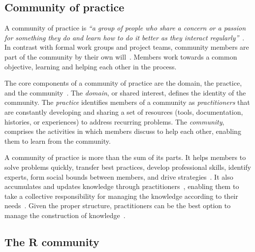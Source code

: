 \subsection{Community of practice}
    A community of practice is \textit{``a group of people who share a concern or a passion for something they do and learn how to do it better as they interact regularly''}~\cite{Wenger2000}.
    In contrast with formal work groups and project teams, community members are part of the community by their own will~\cite{Wenger2000}.
    Members work towards a common objective, learning and helping each other in the process.

    The core components of a community of practice are the domain, the practice, and the community~\cite{Wenger2011}.
    The \textit{domain}, or shared interest, defines the identity of the community.
    The \textit{practice} identifies members of a community as \textit{practitioners} that are constantly developing and sharing a set of resources (tools, documentation, histories, or experiences) to address recurring problems. 
    The \textit{community}, comprises the activities in which members discuss to help each other, enabling them to learn from the community.

    A community of practice is more than the sum of its parts.
    It helps members to solve problems quickly, transfer best practices, develop professional skills, identify experts, form social bounds between members, and drive strategies~\cite{Wenger2011, Storey2014}.
    It also accumulates and updates knowledge through practitioners~\cite{Wenger2010}, enabling them to take a collective responsibility for managing the knowledge according to their needs~\cite{Wenger2011}.
    Given the proper structure, practitioners can be the best option to manage the construction of knowledge~\cite{Wenger2011}.


\subsection{The R community}

